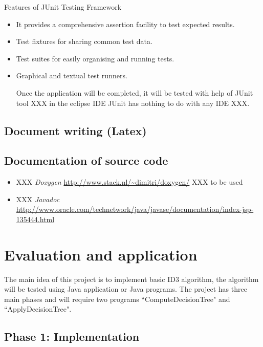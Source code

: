 \documentclass{article}
\begin{document}
Features of JUnit Testing Framework
\begin{itemize}

\item It provides a comprehensive assertion facility to test expected results.
\item Test fixtures for sharing common test data.
\item Test suites for easily organising and running tests.
\item Graphical and textual test runners.

Once the application will be completed, it will be tested with help of JUnit tool XXX in the eclipse IDE  JUnit has nothing to do with any IDE XXX.


\end{itemize}

\subsection{Document writing (Latex)}
\label{sec:latex}

\subsection{Documentation of source code}
\label{sec:documentsource}

\begin{itemize}
\item XXX \textit{Doxygen} \url{http://www.stack.nl/~dimitri/doxygen/} XXX to be used
\item XXX \textit{Javadoc} \url{http://www.oracle.com/technetwork/java/javase/documentation/index-jsp-135444.html}
\end{itemize}





\section{Evaluation and application}
\label{sec:eval}

The main idea of this project is to implement basic ID3 algorithm, the algorithm will be tested using Java application or Java programs. The project has three main phases and will require two programs ``ComputeDecisionTree" and ``ApplyDecisionTree". 


\subsection{Phase 1: Implementation}
\label{sec:phase1}
\end{document}
